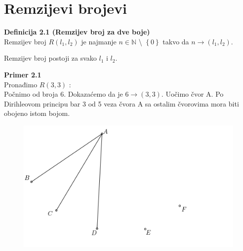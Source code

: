 \documentclass[12pt,a4paper]{article}
\begin{document}
	\newpage
	
	
	\section{Remzijevi brojevi}
	\vspace{1em}
	\begin{mdframed}
	{\fontsize{12pt}{12pt}\textbf{Definicija 2.1 (Remzijev broj za dve boje)}}
	\vspace{0.5em}	
	\\
	Remzijev broj $R(l_{1}, l_{2})$ je najmanje $n \in \mathbb{N}$ \textbackslash {} $\left\lbrace 0\right\rbrace $ takvo da $n\rightarrow(l_{1}, l_{2})$.
	\end{mdframed}
	
	\noindent Remzijev broj postoji za svako $l_1$ i $l_2$.
	
	\vspace{0.7em}
	
	{\noindent\fontsize{12pt}{12pt}\textbf{Primer 2.1}}
	\vspace{0.5em}
	\\	
	Pronađimo $R(3,3)$ :
	\\Počnimo od broja 6. Dokazaćemo da je $6 \rightarrow (3, 3)$. Uočimo čvor A. Po Dirihleovom principu bar 3 od 5 veza čvora A sa ostalim čvorovima mora biti obojeno istom bojom. 
	\begin{figure}[h]
	\centering
	\includegraphics[scale=2.3]{r33.png}
	\end{figure}
	
\end{document}
